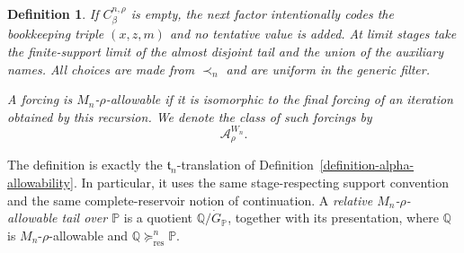 \documentclass[a4paper,11pt]{article}
\newtheorem{definition}[theorem]{Definition}
\newcommand{\forceP}{\mathbb{P}}
\newcommand{\forceQ}{\mathbb{Q}}
\begin{document}
\begin{definition}
If $C^{n,\rho}_\beta$ is empty, the next factor intentionally codes the
bookkeeping triple $(x,z,m)$ and no tentative value is added.  At limit stages
take the finite-support limit of the almost disjoint tail and the union of
the auxiliary names.  All choices are made from $\prec_n$ and are uniform in
the generic filter.

A forcing is \emph{$M_n$-$\rho$-allowable} if it is isomorphic to the final
forcing of an iteration obtained by this recursion.  We denote the class of
such forcings by
\[
   \mathcal A^{W_n}_\rho.
\]
\end{definition}

The definition is exactly the $\mathfrak t_n$-translation of
Definition~\ref{definition-alpha-allowability}.  In particular, it uses the
same stage-respecting support convention and the same complete-reservoir
notion of continuation.  A \emph{relative $M_n$-$\rho$-allowable tail over
$\forceP$} is a quotient $\forceQ/\dot G_{\forceP}$, together with its
presentation, where $\forceQ$ is $M_n$-$\rho$-allowable and
$\forceQ\succeq^n_{\mathrm{res}}\forceP$.
\end{document}
